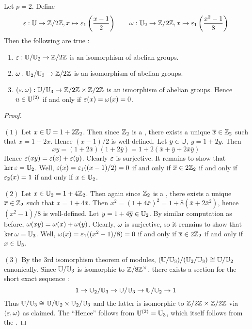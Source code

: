 \begin{prop}
  
  Let $p = 2$. 
  Define \begin{align*}
    \varepsilon : \mathbb{U} \to \mathbb{Z}/2\mathbb{Z}, x \mapsto \varepsilon_1\left(\frac{x - 1}{2}\right)
    \quad\quad 
    \omega : \mathbb{U}_2 \to \mathbb{Z}/2\mathbb{Z}, x \mapsto \varepsilon_1\left(\frac{x^2 - 1}{8}\right)
  \end{align*}
  Then the following are true : 
  \begin{enumerate}
    \item $\varepsilon : \mathbb{U}/\mathbb{U}_2 \to \mathbb{Z}/2\mathbb{Z}$
    is an isomorphism of abelian groups. 
    \item $\omega : \mathbb{U}_2/\mathbb{U}_3 \to \mathbb{Z}/2\mathbb{Z}$ is an isomorphism of abelian groups. 
    \item $(\varepsilon,\omega) : \mathbb{U}/\mathbb{U}_3 \to \mathbb{Z}/2\mathbb{Z} \times \mathbb{Z}/2\mathbb{Z}$
    is an ismorphism of abelian groups. 
    Hence $u \in \mathbb{U}^{(2)}$ if and only if $\varepsilon(x) = \omega(x) = 0$.
  \end{enumerate}
\end{prop}
\begin{proof}~
  
  $(1)$ Let $x \in \mathbb{U} = 1 + 2\mathbb{Z}_2$.
  Then since $\mathbb{Z}_2$ is a , 
  there exists a unique $\overline{x} \in \mathbb{Z}_2$
  such that $x = 1 + 2\bar{x}$.
  Hence $(x - 1)/2$ is well-defined. 
  Let $y \in \mathbb{U}$, $y = 1 + 2 \bar{y}$. 
  Then \[
    x y = (1 + 2 \bar{x})(1 + 2\bar{y}) 
    = 1 + 2 (\bar{x} + \bar{y} + 2\bar{x}\bar{y})
  \]
  Hence $\varepsilon(x y) = \varepsilon(x) + \varepsilon(y)$. 
  Clearly $\varepsilon$ is surjective. 
  It remains to show that $\ker\varepsilon = \mathbb{U}_2$.
  Well, $\varepsilon(x) = \varepsilon_1((x-1)/2) = 0$ if and only if 
  $\overline{x} \in 2\mathbb{Z}_2$ if and only if 
  $\varepsilon_2(x) = 1$ if and only if $x \in \mathbb{U}_2$. 

  $(2)$ Let $x \in \mathbb{U}_2 = 1 + 4 \mathbb{Z}_2$. 
  Then again since $\mathbb{Z}_2$ is a ,
  there exists a unique $\overline{x} \in \mathbb{Z}_2$
  such that $x = 1 + 4\bar{x}$.
  Then $x^2 = (1 + 4\bar{x})^2 = 1 + 8(\bar{x} + 2\bar{x}^2)$,
  hence $(x^2 - 1)/8$ is well-defined. 
  Let $y = 1 + 4 \overline{y} \in \mathbb{U}_2$.
  By similar computation as before, $\omega(x y) = \omega(x) + \omega(y)$. 
  Clearly, $\omega$ is surjective,
  so it remains to show that $\ker\omega = \mathbb{U}_3$.
  Well, $\omega(x) = \varepsilon_1((x^2 - 1 )/ 8) = 0$ if and only if 
  $\overline{x} \in 2\mathbb{Z}_2$ if and only if 
  $x \in \mathbb{U}_3$. 

  $(3)$ By the 3rd isomorphism theorem of modules, 
  $(\mathbb{U}/\mathbb{U}_3)/(\mathbb{U}_2/\mathbb{U}_3) \cong_{} \mathbb{U}/\mathbb{U}_2$ canonically.
  Since $\mathbb{U}/\mathbb{U}_3$ is isomorphic to $\mathbb{Z}/8\mathbb{Z}^\times$,
  there exists a section for the short exact sequence : 
  \[
    1 \to \mathbb{U}_2/\mathbb{U}_3 \to \mathbb{U}/\mathbb{U}_3 \to \mathbb{U}/\mathbb{U}_2 \to 1
  \]
  Thus $\mathbb{U}/\mathbb{U}_3 \cong_{} \mathbb{U}/\mathbb{U}_2 \times \mathbb{U}_2/\mathbb{U}_3$
  and the latter is isomorphic to $\mathbb{Z}/2\mathbb{Z} \times \mathbb{Z}/2\mathbb{Z}$ via 
  $(\varepsilon,\omega)$ as claimed. 
  The ``Hence'' follows from $\mathbb{U}^{(2)} = \mathbb{U}_3$,
  which itself follows from the 
  . 

\end{proof}